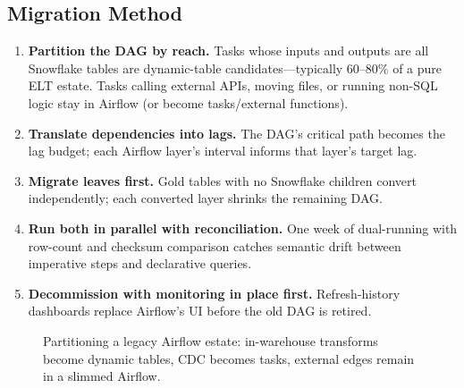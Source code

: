 \subsection{Migration Method}
\begin{enumerate}
    \item \textbf{Partition the DAG by reach.} Tasks whose inputs and outputs are all Snowflake tables are dynamic-table candidates---typically 60--80\% of a pure ELT estate. Tasks calling external APIs, moving files, or running non-SQL logic stay in Airflow (or become tasks/external functions).
    \item \textbf{Translate dependencies into lags.} The DAG's critical path becomes the lag budget; each Airflow layer's interval informs that layer's target lag.
    \item \textbf{Migrate leaves first.} Gold tables with no Snowflake children convert independently; each converted layer shrinks the remaining DAG.
    \item \textbf{Run both in parallel with reconciliation.} One week of dual-running with row-count and checksum comparison catches semantic drift between imperative steps and declarative queries.
    \item \textbf{Decommission with monitoring in place first.} Refresh-history dashboards replace Airflow's UI before the old DAG is retired.
\end{enumerate}

\begin{figure}[H]
    \centering
    \caption{Partitioning a legacy Airflow estate: in-warehouse transforms become dynamic tables, CDC becomes tasks, external edges remain in a slimmed Airflow.}
    \label{fig:chapter11-airflow-migration}
\end{figure}

